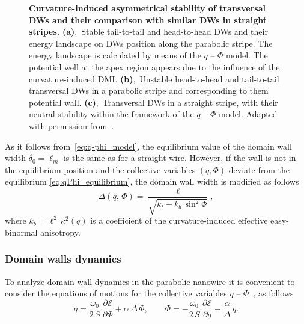 \begin{figure}
	\caption{\textbf{Curvature-induced asymmetrical stability of transversal DWs and their comparison with similar DWs in straight stripes.} \textbf{(a)},~Stable tail-to-tail and head-to-head DWs and their energy landscape on DWs position along the parabolic stripe. The energy landscape is calculated by means of the $q$ -- $\Phi$ model. The potential well at the apex region appears due to the influence of the curvature-induced DMI. \textbf{(b)},~Unstable head-to-head and tail-to-tail transversal DWs in a parabolic stripe and corresponding to them potential wall. \textbf{(c)},~Transversal DWs in a straight stripe, with their neutral stability within the framework of the $q$ -- $\Phi$ model. Adapted with permission from~\cite{Volkov19c}.}
	\label{fig:Parabola_n_straight_DWs}
\end{figure}

As it follows from~\eqref{eq:q-phi_model}, the equilibrium value of the domain wall width $\delta_0 = \ell_m$ is the same as for a straight wire. However, if the wall is not in the equilibrium position and the collective variables $(q,\Phi)$ deviate from the equilibrium \eqref{eq:qPhi_equilibrium}, the domain wall width is modified as follows~\cite{Yershov15b}
\begin{equation}
	\Delta(q, \, \Phi) = \dfrac{\ell}{\sqrt{k_t - k_b \, \sin^2 \Phi}},
\end{equation}
where $k_b = \ell^2 \, \kappa^2(q)$ is a coefficient of the curvature-induced effective easy-binormal anisotropy. 



\subsubsection{Domain walls dynamics} \label{subsubsec:Parabola_dynamics}

To analyze domain wall dynamics in the parabolic nanowire it is convenient to consider the equations of motions for the collective variables $q$ -- $\Phi$~\cite{Yershov15b}, as follows
\begin{equation} \label{eq:qPhi_dynamics}
	\dot{q} = \dfrac{\omega_0}{2 \, S} \, \dfrac{\partial \mathcal{E}}{\partial \Phi} + \alpha \, \Delta \, \dot{\Phi}, \qquad \dot{\Phi} = - \dfrac{\omega_0}{2 \, S} \, \dfrac{\partial \mathcal{E}}{\partial q} - \dfrac{\alpha}{\Delta} \, \dot{q}.
\end{equation}

